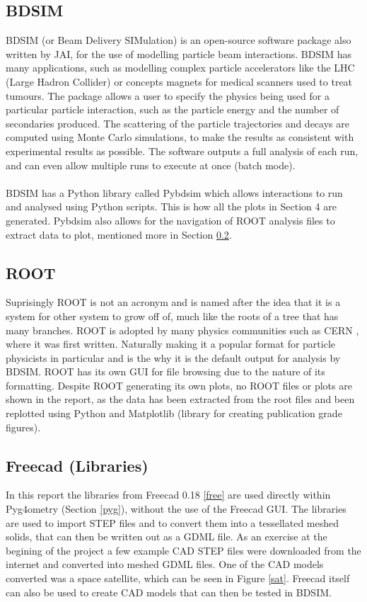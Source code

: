 \documentclass[12pt,a4paper]{article}
\begin{document}
\subsection{BDSIM}
\label{bdsim}
BDSIM (or Beam Delivery SIMulation) is an open-source software package also written by JAI, for the use of modelling particle beam interactions. BDSIM has many applications, such as modelling complex particle accelerators like the LHC (Large Hadron Collider) or concepts magnets for medical scanners used to treat tumours. The package allows a user to specify the physics being used for a particular particle interaction, such as the particle energy and the number of secondaries produced. The scattering of the particle trajectories and decays are computed using Monte Carlo simulations, to make the results as consistent with experimental results as possible. The software outputs a full analysis of each run, and can even allow multiple runs to execute at once (batch mode).
\\\\
BDSIM has a Python library called Pybdsim which allows interactions to run and analysed using Python scripts. This is how all the plots in Section 4 are generated. Pybdsim also allows for the navigation of ROOT analysis files to extract data to plot, mentioned more in Section \ref{root}.

\subsection{ROOT}\label{root}
Suprisingly ROOT is not an acronym and is named after the idea that it is a system for other system to grow off of, much like the roots of a tree that has many branches. ROOT is adopted by many physics communities such as CERN \cite{cern}, where it was first written. Naturally making it a popular format for particle physicists in particular and is the why it is the default output for analysis by BDSIM. ROOT has its own GUI for file browsing due to the nature of its formatting. Despite ROOT generating its own plots, no ROOT files or plots are shown in the report, as the data has been extracted from the root files and been replotted using Python and Matplotlib (library for creating publication grade figures).

\subsection{Freecad (Libraries)}
In this report the libraries from Freecad 0.18 \ref{free} are used directly within Pyg4ometry (Section \ref{pyg}), without the use of the Freecad GUI. The libraries are used to import STEP files and to convert them into a tessellated meshed solids, that can then be written out as a GDML file. As an exercise at the begining of the project a few example CAD STEP files were downloaded from the internet and converted into meshed GDML files. One of the CAD models converted was a space satellite, which can be seen in Figure \ref{sat}. Freecad itself can also be used to create CAD models that can then be tested in BDSIM. 
\end{document}
